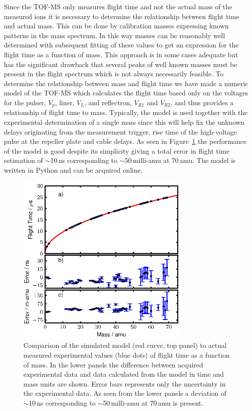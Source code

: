 \documentclass[aip,rsi]{revtex4-1}
\begin{document}
Since the TOF-MS only measures flight time and not the actual mass of the measured ions it is necessary to determine the relationship between flight time and actual mass. This can be done by calibration masses expressing known patterns in the mass spectrum. In this way masses can be reasonably well determined with subsequent fitting of these values to get an expression for the flight time as a function of mass. This approach is in some cases adequate but has the significant drawback that several peaks of well known masses must be present in the flight spectrum which is not always necessarily feasible. To determine the relationship between mass and flight time we have made a numeric model of the TOF-MS which calculates the flight time based only on the voltages for the pulser, $V_p$, liner, $V_L$, and reflectron, $V_{R1}$ and $V_{R2}$, and thus provides a relationship of flight time to mass. Typically, the model is used together with the experimental determination of a single mass since this will help fix the unknown delays originating from the measurement trigger, rise time of the high-voltage pulse at the repeller plate and cable delays. As seen in Figure~\ref{fig:model_error} the performance of the model is good despite its simplicity giving a total error in flight time estimation of $\sim$10\,ns corresponding to $\sim$50\,milli-amu at 70\,amu. The model is written in Python and can be acquired online\cite{ModelGithub}.
\begin{figure}
 \includegraphics[width=8.5cm]{model_error.eps}
 \caption{Comparison of the simulated model (red curve, top panel) to actual measured experimental values (blue dots) of flight time as a function of mass. In the lower panels the difference between acquired experimental data and data calculated from the model in time and mass units are shown. Error bars represents only the uncertainty in the experimental data. As seen from the lower panels a deviation of $\sim$10\,ns corresponding to $\sim$50\,milli-amu at 70\,amu is present.\label{fig:model_error}}
\end{figure}
\end{document}
